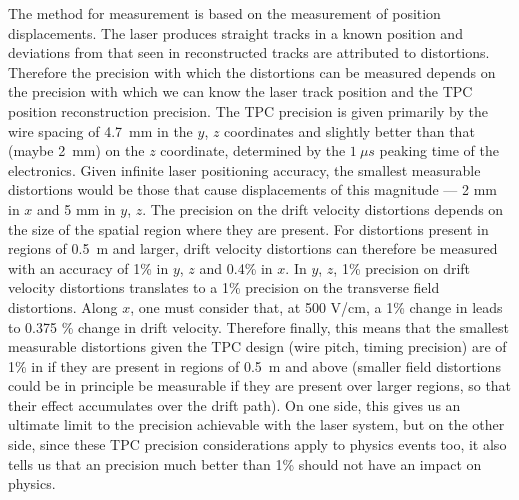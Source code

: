 The method for \efield measurement is based on the measurement of position displacements. The laser produces straight tracks in a known position and deviations from that seen in reconstructed tracks are attributed to \efield distortions. Therefore the precision with which the \efield distortions can be measured depends on the precision with which we can know the laser track position and the TPC position reconstruction precision.
The TPC precision is given primarily by the wire spacing of 4.7~mm in the $y$, $z$ coordinates and slightly better than that (maybe 2~mm) on the $z$ coordinate, determined by the $1~\mu s$ peaking time of the electronics. Given infinite laser positioning accuracy, the smallest measurable \efield distortions would be those that cause displacements of this magnitude --- 2 mm in $x$ and 5 mm in $y$, $z$. The precision on the drift velocity distortions depends on the size of the spatial region where they are present. For distortions present in regions of 0.5~m and larger, drift velocity distortions can therefore be measured with an accuracy of 1\% in $y$, $z$ and 0.4\% in $x$. In $y$, $z$, 1\% precision on drift velocity distortions translates to a 1\% precision on the transverse field distortions. Along $x$, one must consider that, at 500 V/cm, a 1\% change in \efield leads to 0.375 \% change in drift velocity. Therefore finally, this means that the smallest measurable distortions given the TPC design (wire pitch, timing precision) are of 1\% in \efield if they are present in regions of 0.5~m and above (smaller field distortions could be in principle be measurable if they are present over larger regions, so that their effect accumulates over the drift path).
On one side, this gives us an ultimate limit to the \efield precision achievable with the laser system, but on the other side, since these TPC precision considerations apply to physics events too, it also tells us that an \efield precision much better than 1\% should not have an impact on physics.

